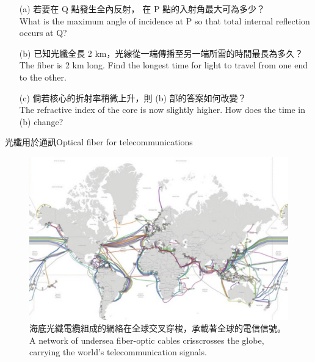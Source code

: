 \documentclass[beamer=true]{standalone}
\begin{document}
\begin{eg}
    \begin{itemize}
        \item [(a)] 若要在 Q 點發生全內反射，	在 P 點的入射角最大可為多少？\\What is the maximum angle of incidence at P so that total internal reflection occurs at Q?
    \end{itemize}

\end{eg}

\begin{eg}
    \begin{itemize}
        \item [(b)] 已知光纖全長 2 km，光線從一端傳播至另一端所需的時間最長為多久？\\The fiber is 2 km long. Find the longest time for light to travel from one end to the other.
    \end{itemize}

\end{eg}

\begin{eg}
    \begin{itemize}
        \item [(c)] 倘若核心的折射率稍微上升，則 (b) 部的答案如何改變？\\The refractive index of the core is now slightly higher. How does the time in (b) change?
    \end{itemize}
    
\end{eg}

\begin{frame}{光纖用於通訊Optical fiber for telecommunications}
    \begin{figure}
        \centering
        \includegraphics[width=0.75\linewidth]{assets/dqwd120d.png}
        \caption{海底光纖電纜組成的網絡在全球交叉穿梭，承載著全球的電信信號。A network of undersea fiber-optic cables crisscrosses the globe, carrying the world's telecommunication signals.}
        
    \end{figure}
    
\end{frame}
\end{document}
